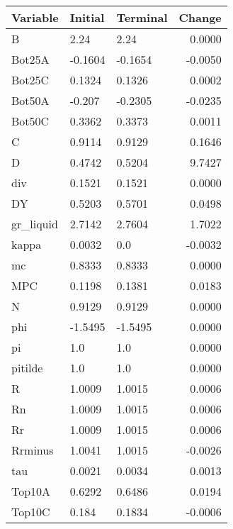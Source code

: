 \begin{table}
\centering
\label{tab:stst_comparison_low_B_wedge_permanent_asymmetric}
\begin{tabular}{lllr}
\toprule
                Variable & Initial & Terminal &  Change \\
\midrule
                       B &    2.24 &     2.24 &  0.0000 \\
                  Bot25A & -0.1604 &  -0.1654 & -0.0050 \\
                  Bot25C &  0.1324 &   0.1326 &  0.0002 \\
                  Bot50A &  -0.207 &  -0.2305 & -0.0235 \\
                  Bot50C &  0.3362 &   0.3373 &  0.0011 \\
                       C &  0.9114 &   0.9129 &  0.1646 \\
                       D &  0.4742 &   0.5204 &  9.7427 \\
                     div &  0.1521 &   0.1521 &  0.0000 \\
                      DY &  0.5203 &   0.5701 &  0.0498 \\
               gr\_liquid &  2.7142 &   2.7604 &  1.7022 \\
                   kappa &  0.0032 &      0.0 & -0.0032 \\
                      mc &  0.8333 &   0.8333 &  0.0000 \\
                     MPC &  0.1198 &   0.1381 &  0.0183 \\
                       N &  0.9129 &   0.9129 &  0.0000 \\
                     phi & -1.5495 &  -1.5495 &  0.0000 \\
                      pi &     1.0 &      1.0 &  0.0000 \\
                 pitilde &     1.0 &      1.0 &  0.0000 \\
                       R &  1.0009 &   1.0015 &  0.0006 \\
                      Rn &  1.0009 &   1.0015 &  0.0006 \\
                      Rr &  1.0009 &   1.0015 &  0.0006 \\
                 Rrminus &  1.0041 &   1.0015 & -0.0026 \\
                     tau &  0.0021 &   0.0034 &  0.0013 \\
                  Top10A &  0.6292 &   0.6486 &  0.0194 \\
                  Top10C &   0.184 &   0.1834 & -0.0006 \\

\end{tabular}
\end{table}
